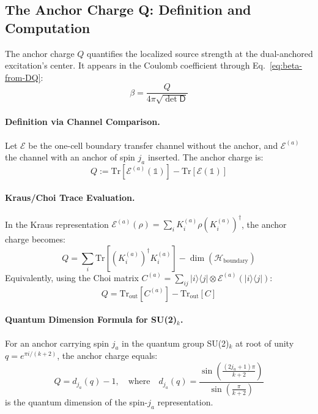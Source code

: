 \documentclass[11pt]{article}
\theoremstyle{plain}
\theoremstyle{definition}
\begin{document}
\subsection{The Anchor Charge Q: Definition and Computation}
\label{subsec:anchor-charge}

The anchor charge $Q$ quantifies the localized source strength at the dual-anchored excitation's center. It appears in the Coulomb coefficient through Eq.~\eqref{eq:beta-from-DQ}:
\[
  \beta = \frac{Q}{4\pi\sqrt{\det \mathsf{D}}}
\]

\paragraph{Definition via Channel Comparison.}
Let $\mathcal{E}$ be the one-cell boundary transfer channel without the anchor, and $\mathcal{E}^{(a)}$ the channel with an anchor of spin $j_a$ inserted. The anchor charge is:
\begin{equation}\label{eq:Q-channel-def}
  Q := \mathrm{Tr}[\mathcal{E}^{(a)}(\mathbb{1})] - \mathrm{Tr}[\mathcal{E}(\mathbb{1})]
\end{equation}

\paragraph{Kraus/Choi Trace Evaluation.}
In the Kraus representation $\mathcal{E}^{(a)}(\rho) = \sum_i K_i^{(a)} \rho (K_i^{(a)})^\dagger$, the anchor charge becomes:
\begin{equation}\label{eq:Q-Kraus}
  Q = \sum_i \mathrm{Tr}[(K_i^{(a)})^\dagger K_i^{(a)}] - \dim(\mathcal{H}_{\text{boundary}})
\end{equation}
Equivalently, using the Choi matrix $C^{(a)} = \sum_{ij} |i\rangle\langle j| \otimes \mathcal{E}^{(a)}(|i\rangle\langle j|)$:
\[
  Q = \mathrm{Tr}_{\text{out}}[C^{(a)}] - \mathrm{Tr}_{\text{out}}[C]
\]

\paragraph{Quantum Dimension Formula for SU(2)$_k$.}
For an anchor carrying spin $j_a$ in the quantum group SU(2)$_k$ at root of unity $q = e^{\pi i/(k+2)}$, the anchor charge equals:
\begin{equation}\label{eq:Q-quantum-dim}
  Q = d_{j_a}(q) - 1, \quad \text{where} \quad d_{j_a}(q) = \frac{\sin\left(\frac{(2j_a+1)\pi}{k+2}\right)}{\sin\left(\frac{\pi}{k+2}\right)}
\end{equation}
is the quantum dimension of the spin-$j_a$ representation.
\end{document}
